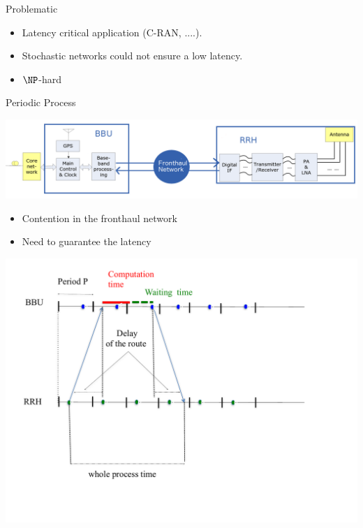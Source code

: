 \documentclass[10 pt]{beamer}
\begin{document}
\begin{frame}{Problematic }
\begin{itemize}
\item Latency critical application (C-RAN, ....).
\item Stochastic networks could not ensure a low latency.
\item $\NP$-hard 
\end{itemize}



 \begin{block}{Periodic Process}
 
\begin{center}
   \includegraphics[scale=0.15]{BBURRH2.png}

    
\begin{itemize}
\item Contention in the fronthaul network
\item Need to guarantee the latency
\end{itemize}
 \end{center}
 
 \end{block}

 
 \end{frame}

 \begin{frame}
 \begin{center}
\includegraphics[scale=0.5]{periodic_process.pdf}

\end{center}
 \end{frame}
\end{document}
